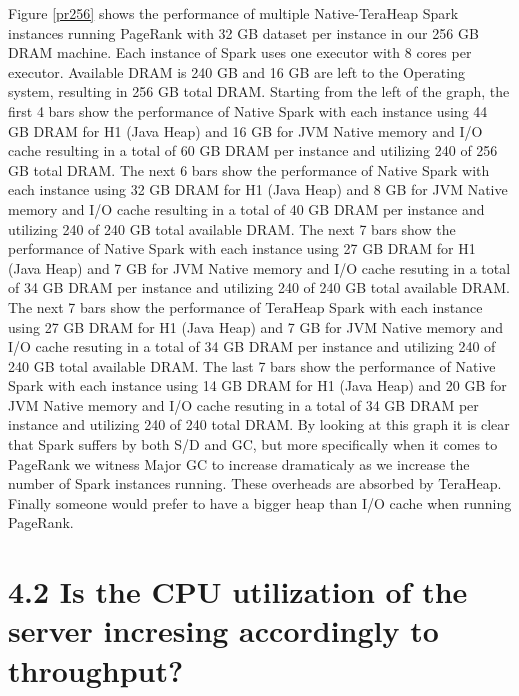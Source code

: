 \documentclass[twocolumn,10pt]{asme2e}
\begin{document}
Figure \ref{pr256} shows the performance of multiple Native-TeraHeap Spark instances running PageRank with 32 GB dataset per instance in our 256 GB DRAM machine. Each instance of Spark uses one executor with 8 cores per executor. Available DRAM is 240 GB and 16 GB are left to the Operating system, resulting in 256 GB total DRAM. Starting from the left of the graph, the first 4 bars show the performance of Native Spark with each instance using 44 GB DRAM for H1 (Java Heap) and 16 GB for JVM Native memory and I/O cache resulting in a total of 60 GB DRAM per instance and utilizing 240 of 256 GB total DRAM. The next 6 bars show the performance of Native Spark with each instance using 32 GB DRAM for H1 (Java Heap) and 8 GB for JVM Native memory and I/O cache resulting in a total of 40 GB DRAM per instance and utilizing 240 of 240 GB total available DRAM. The next 7 bars show the performance of Native Spark with each instance using 27 GB DRAM for H1 (Java Heap) and 7 GB for JVM Native memory and I/O cache resuting in a total of 34 GB DRAM per instance and utilizing 240 of 240 GB total available DRAM. The next 7 bars show the performance of TeraHeap Spark with each instance using 27 GB DRAM for H1 (Java Heap) and 7 GB for JVM Native memory and I/O cache resuting in a total of 34 GB DRAM per instance and utilizing 240 of 240 GB total available DRAM. The last 7 bars show the performance of Native Spark with each instance using 14 GB DRAM for H1 (Java Heap) and 20 GB for JVM Native memory and I/O cache resuting in a total of 34 GB DRAM per instance and utilizing 240 of 240 total DRAM. By looking at this graph it is clear that Spark suffers by both S/D and GC, but more specifically when it comes to PageRank we witness Major GC to increase dramaticaly as we increase the number of Spark instances running. These overheads are absorbed by TeraHeap.
Finally someone would prefer to have a bigger heap than I/O cache when running PageRank.

\section*{4.2 Is the CPU utilization of the server incresing accordingly to throughput?}
\end{document}
